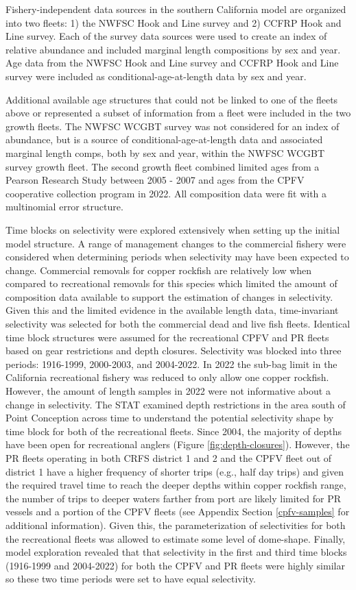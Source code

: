\documentclass[11pt,
  english,
  letterpaper,
]{article}
\begin{document}
Fishery-independent data sources in the southern California model are organized into two fleets: 1) the NWFSC Hook and Line survey and 2) CCFRP Hook and Line survey. Each of the survey data sources were used to create an index of relative abundance and included marginal length compositions by sex and year. Age data from the NWFSC Hook and Line survey and CCFRP Hook and Line survey were included as conditional-age-at-length data by sex and year.

Additional available age structures that could not be linked to one of the fleets above or represented a subset of information from a fleet were included in the two growth fleets. The NWFSC WCGBT survey was not considered for an index of abundance, but is a source of conditional-age-at-length data and associated marginal length comps, both by sex and year, within the NWFSC WCGBT survey growth fleet. The second growth fleet combined limited ages from a Pearson Research Study between 2005 - 2007 and ages from the CPFV cooperative collection program in 2022. All composition data were fit with a multinomial error structure.

Time blocks on selectivity were explored extensively when setting up the initial model structure. A range of management changes to the commercial fishery were considered when determining periods when selectivity may have been expected to change. Commercial removals for copper rockfish are relatively low when compared to recreational removals for this species which limited the amount of composition data available to support the estimation of changes in selectivity. Given this and the limited evidence in the available length data, time-invariant selectivity was selected for both the commercial dead and live fish fleets. Identical time block structures were assumed for the recreational CPFV and PR fleets based on gear restrictions and depth closures. Selectivity was blocked into three periods: 1916-1999, 2000-2003, and 2004-2022. In 2022 the sub-bag limit in the California recreational fishery was reduced to only allow one copper rockfish. However, the amount of length samples in 2022 were not informative about a change in selectivity. The STAT examined depth restrictions in the area south of Point Conception across time to understand the potential selectivity shape by time block for both of the recreational fleets. Since 2004, the majority of depths have been open for recreational anglers (Figure \ref{fig:depth-closures}). However, the PR fleets operating in both CRFS district 1 and 2 and the CPFV fleet out of district 1 have a higher frequency of shorter trips (e.g., half day trips) and given the required travel time to reach the deeper depths within copper rockfish range, the number of trips to deeper waters farther from port are likely limited for PR vessels and a portion of the CPFV fleets (see Appendix Section \ref{cpfv-samples} for additional information). Given this, the parameterization of selectivities for both the recreational fleets was allowed to estimate some level of dome-shape. Finally, model exploration revealed that that selectivity in the first and third time blocks (1916-1999 and 2004-2022) for both the CPFV and PR fleets were highly similar so these two time periods were set to have equal selectivity.
\end{document}
